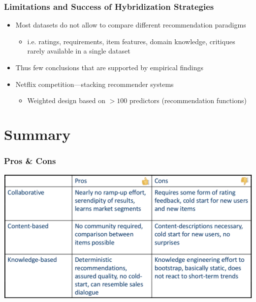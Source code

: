 \documentclass{beamer}
\begin{document}
\begin{frame}
    \frametitle{Limitations and Success of Hybridization Strategies}
    \begin{itemize}
    \item Most datasets do not allow to compare different recommendation
        paradigms
        \begin{itemize}
        \item i.e. ratings, requirements, item features, domain knowledge,
            critiques rarely available in a single dataset
        \end{itemize}
    \item Thus few conclusions that are supported by empirical findings
    \item Netflix competition---stacking recommender systems
        \begin{itemize}
        \item Weighted design based on $>100$ predictors (recommendation
            functions)
        \end{itemize}
    \end{itemize}
\end{frame}

\section{Summary}

\begin{frame}
    \frametitle{Pros \& Cons}    
    \centering
    \vsep
    \includegraphics[width=\linewidth]{techniques}
\end{frame}
\end{document}
